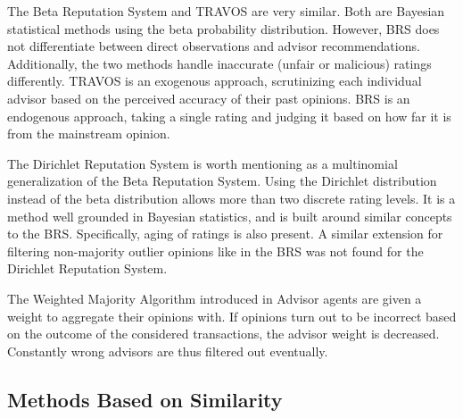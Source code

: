 \documentclass[%
    ]{\PathToTumTemplate/thesis/tum_thesis}
\begin{document}
The Beta Reputation System and TRAVOS are very similar.
Both are Bayesian statistical methods using the beta probability distribution.
However, BRS does not differentiate between direct observations and advisor recommendations.
Additionally, the two methods handle inaccurate (unfair or malicious) ratings differently.
TRAVOS is an exogenous approach, scrutinizing each individual advisor based on the perceived accuracy of their past opinions.
BRS is an endogenous approach, taking a single rating and judging it based on how far it is from the mainstream opinion.


The Dirichlet Reputation System is worth mentioning as a multinomial generalization of the Beta Reputation System\cite{josang_dirichlet_2007}.
Using the Dirichlet distribution instead of the beta distribution allows more than two discrete rating levels.
It is a method well grounded in Bayesian statistics, and is built around similar concepts to the BRS.
Specifically, aging of ratings is also present.
A similar extension for filtering non-majority outlier opinions like in the BRS was not found for the Dirichlet Reputation System.

The Weighted Majority Algorithm introduced in \cite{yu_detecting_2003}  
Advisor agents are given a weight to aggregate their opinions with.
If opinions turn out to be incorrect based on the outcome of the considered transactions, the advisor weight is decreased.
Constantly wrong advisors are thus filtered out eventually.



\subsection{Methods Based on Similarity}
\end{document}
